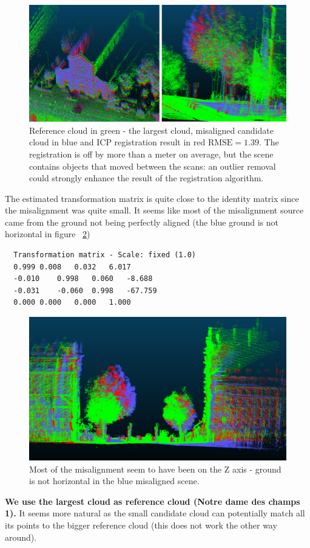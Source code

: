 \documentclass[a4paper]{article}
\begin{document}
\pagebreak

\begin{figure}[ht]
    \centering
    \includegraphics[width=0.8\linewidth]{figures/notre_dame_des_champs_registration.png}
    \caption{Reference cloud in green - the largest cloud, misaligned candidate cloud in blue and ICP registration result in red $\text{RMSE}=1.39$. The registration is off by more than a meter on average, but the scene contains objects that moved between the scans: an outlier removal could strongly enhance the result of the registration algorithm.}
    \label{fig:CC_notredame}
\end{figure}

The estimated transformation matrix is quite close to the identity matrix since the misalignment was quite small. It seems like most of the misalignment source came from the ground not being perfectly aligned (the blue ground is not horizontal in figure ~\ref{fig:CC_notredame_z})
\begin{verbatim}
  Transformation matrix - Scale: fixed (1.0)
  0.999	0.008	0.032	6.017
  -0.010	0.998	0.060	-8.688
  -0.031	-0.060	0.998	-67.759
  0.000	0.000	0.000	1.000
\end{verbatim}

\begin{figure}[ht]
    \centering
    \includegraphics[width=0.8\linewidth]{figures/notre_dame_des_champs_registration_rotation.png}
    \caption{Most of the misalignment seem to have been on the Z axis - ground is not horizontal in the blue misaligned scene.}
    \label{fig:CC_notredame_z}
\end{figure}
\textbf{We use the largest cloud as reference cloud (Notre dame des champs 1).} It seems more natural as the small candidate cloud can potentially match all its points to the bigger reference cloud (this does not work the other way around).
\end{document}
